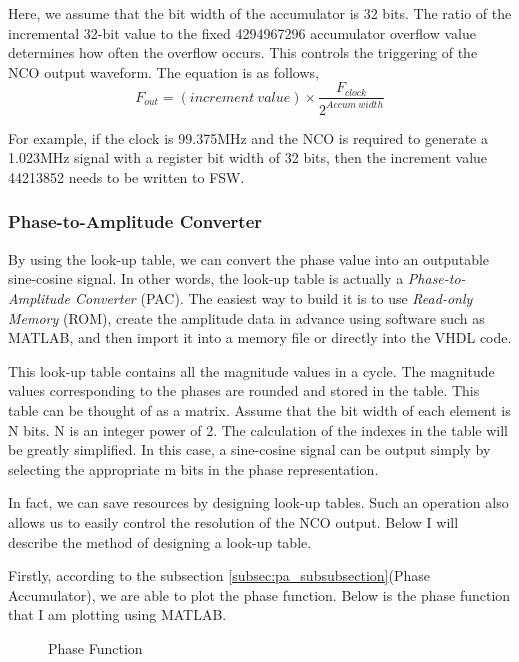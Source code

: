 Here, we assume that the bit width of the accumulator is 32 bits. The ratio of the incremental 32-bit value to the fixed \num{4294967296} accumulator overflow value determines how often the overflow occurs. This controls the triggering of the NCO output waveform. The equation is as follows,
\begin{equation}
    F_{out} = (increment\ value) \times \frac{F_{clock}}{2^{Accum\ width}}
    \label{equ:nco}
\end{equation}

For example, if the clock is 99.375MHz and the NCO is required to generate a 1.023MHz signal with a register bit width of 32 bits, then the increment value \num{44213852} needs to be written to FSW.

\subsubsection{Phase-to-Amplitude Converter}
By using the look-up table, we can convert the phase value into an outputable sine-cosine signal. In other words, the look-up table is actually a \textit{Phase-to-Amplitude Converter} (PAC). The easiest way to build it is to use \textit{Read-only Memory} (ROM)\cite{RN190}, create the amplitude data in advance using software such as MATLAB, and then import it into a memory file or directly into the VHDL code.

This look-up table contains all the magnitude values in a cycle. The magnitude values corresponding to the phases are rounded and stored in the table. This table can be thought of as a matrix. Assume that the bit width of each element is N bits. N is an integer power of 2. The calculation of the indexes in the table will be greatly simplified\cite{RN194}. In this case, a sine-cosine signal can be output simply by selecting the appropriate m bits in the phase representation.

In fact, we can save resources by  designing look-up tables\cite{RN193}. Such an operation also allows us to easily control the resolution of the NCO output. Below I will describe the method of designing a look-up table.

Firstly, according to the subsection \ref{subsec:pa_subsubsection}(Phase Accumulator), we are able to plot the phase function. Below is the phase function that I am plotting using MATLAB.

\begin{figure}[!htbp]
    \centering
    
    \caption{Phase Function}
    \label{fig:phase_function}
\end{figure}

